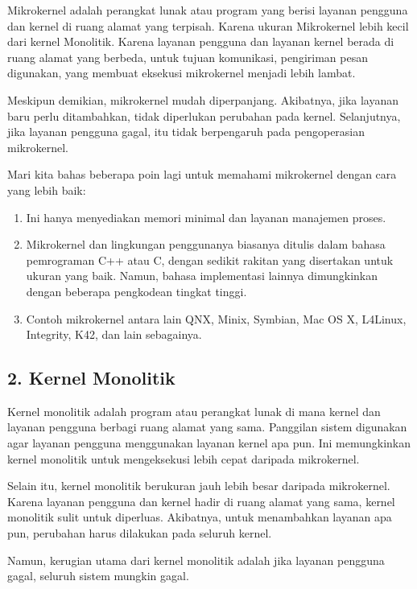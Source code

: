 Mikrokernel adalah perangkat lunak atau program yang berisi layanan pengguna dan kernel di ruang alamat yang terpisah. Karena ukuran Mikrokernel lebih kecil dari kernel Monolitik. Karena layanan pengguna dan layanan kernel berada di ruang alamat yang berbeda, untuk tujuan komunikasi, pengiriman pesan digunakan, yang membuat eksekusi mikrokernel menjadi lebih lambat.

Meskipun demikian, mikrokernel mudah diperpanjang. Akibatnya, jika layanan baru perlu ditambahkan, tidak diperlukan perubahan pada kernel. Selanjutnya, jika layanan pengguna gagal, itu tidak berpengaruh pada pengoperasian mikrokernel.

Mari kita bahas beberapa poin lagi untuk memahami mikrokernel dengan cara yang lebih baik: 

\begin{enumerate}
	\item Ini hanya menyediakan memori minimal dan layanan manajemen proses.
	
	\item Mikrokernel dan lingkungan penggunanya biasanya ditulis dalam bahasa pemrograman C++ atau C, dengan sedikit rakitan yang disertakan untuk ukuran yang baik. Namun, bahasa implementasi lainnya dimungkinkan dengan beberapa pengkodean tingkat tinggi.
	
	\item Contoh mikrokernel antara lain QNX, Minix, Symbian, Mac OS X, L4Linux, Integrity, K42, dan lain sebagainya.
\end{enumerate}

\vskip0.5cm

\subsection{2. Kernel Monolitik}
Kernel monolitik adalah program atau perangkat lunak di mana kernel dan layanan pengguna berbagi ruang alamat yang sama. Panggilan sistem digunakan agar layanan pengguna menggunakan layanan kernel apa pun. Ini memungkinkan kernel monolitik untuk mengeksekusi lebih cepat daripada mikrokernel.

Selain itu, kernel monolitik berukuran jauh lebih besar daripada mikrokernel. Karena layanan pengguna dan kernel hadir di ruang alamat yang sama, kernel monolitik sulit untuk diperluas. Akibatnya, untuk menambahkan layanan apa pun, perubahan harus dilakukan pada seluruh kernel.

Namun, kerugian utama dari kernel monolitik adalah jika layanan pengguna gagal, seluruh sistem mungkin gagal.

